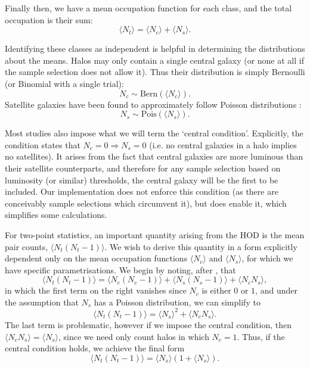 \documentclass[5p,aas_macros]{elsarticle}
\newcommand{\Nc}{\langle N_c \rangle}
\newcommand{\Ns}{\langle N_s \rangle}
\newcommand{\Nt}{\langle N_t \rangle}
\begin{document}
Finally then, we have a mean occupation function for each class, and the total occupation is their sum:
\begin{equation}
    \Nt = \Nc + \Ns.
\end{equation}

Identifying these classes as independent is helpful in determining the distributions about the means. Halos may only contain a single central galaxy (or none at all if the sample selection does not allow it). Thus their distribution is simply Bernoulli (or Binomial with a single trial):
\begin{equation}
    N_c \sim \text{Bern}(\Nc).
\end{equation}
Satellite galaxies have been found to approximately follow Poisson distributions \citep{Kauffmann2004,Zheng2005}:
\begin{equation}
    N_s \sim \text{Pois}(\Ns).
\end{equation}

Most studies also impose what we will term the `central condition'. Explicitly, the condition states that $N_c = 0 \Rightarrow N_s = 0$ (i.e. no central galaxies in a halo implies no satellites).
It arises from the fact that central galaxies are more luminous than their satellite counterparts, and therefore for any sample selection based on luminosity (or similar) thresholds, the central galaxy will be the first to be included.  Our implementation does not enforce this condition (as there are conceivably sample selections which circumvent it), but does enable it, which simplifies some calculations.

For two-point statistics, an important quantity arising from the HOD is the mean pair counts, $\langle N_t(N_t-1) \rangle$. We wish to derive this quantity in a form explicitly dependent only on the mean occupation functions $\Nc$ and $\Ns$, for which we have specific parametrisations. We begin by noting, after \citet{Zheng2005}, that
\begin{equation}
    \langle N_t(N_t-1) \rangle = \langle N_c(N_c-1) \rangle + \langle N_s(N_s-1) \rangle + \langle N_c N_s \rangle,
\end{equation}
in which the first term on the right vanishes since $N_c$ is either $0$ or $1$, and under the assumption that $N_s$ has a Poisson distribution, we can simplify to
\begin{equation}
    \label{eq:nt_pairs}
    \langle N_t(N_t-1) \rangle = \Ns^2 + \langle N_c N_s \rangle.
\end{equation}
The last term is problematic, however if we impose the central condition, then $\langle N_c N_s \rangle = \Ns$, since we need only count halos in which $N_c = 1$. Thus, if the central condition holds, we achieve the final form
\begin{equation}
    \langle N_t(N_t-1) \rangle = \Ns(1 + \Ns).
\end{equation}
\end{document}

